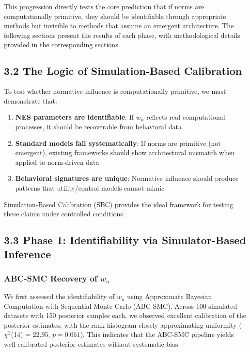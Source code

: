 \documentclass[
  11pt,
]{article}
\providecommand{\tightlist}{%
  \setlength{\itemsep}{0pt}\setlength{\parskip}{0pt}}
\begin{document}
This progression directly tests the core prediction that if norms are
computationally primitive, they should be identifiable through
appropriate methods but invisible to methods that assume an emergent
architecture. The following sections present the results of each phase,
with methodological details provided in the corresponding sections.

\subsection{3.2 The Logic of Simulation-Based
Calibration}\label{the-logic-of-simulation-based-calibration}

To test whether normative influence is computationally primitive, we
must demonstrate that:

\begin{enumerate}
\def\labelenumi{\arabic{enumi}.}
\tightlist
\item
  \textbf{NES parameters are identifiable}: If \(w_n\) reflects real
  computational processes, it should be recoverable from behavioral data
\item
  \textbf{Standard models fail systematically}: If norms are primitive
  (not emergent), existing frameworks should show architectural mismatch
  when applied to norm-driven data
\item
  \textbf{Behavioral signatures are unique}: Normative influence should
  produce patterns that utility/control models cannot mimic
\end{enumerate}

Simulation-Based Calibration (SBC) provides the ideal framework for
testing these claims under controlled conditions.

\subsection{3.3 Phase 1: Identifiability via Simulator-Based
Inference}\label{phase-1-identifiability-via-simulator-based-inference}

\subsubsection{\texorpdfstring{ABC-SMC Recovery of
\(w_n\)}{ABC-SMC Recovery of w\_n}}\label{abc-smc-recovery-of-w_n}

We first assessed the identifiability of \(w_n\) using Approximate
Bayesian Computation with Sequential Monte Carlo (ABC-SMC). Across 100
simulated datasets with 150 posterior samples each, we observed
excellent calibration of the posterior estimates, with the rank
histogram closely approximating uniformity (\(\chi^2\)(14) = 22.95,
\(p = 0.061\)). This indicates that the ABC-SMC pipeline yields
well-calibrated posterior estimates without systematic bias.
\end{document}
